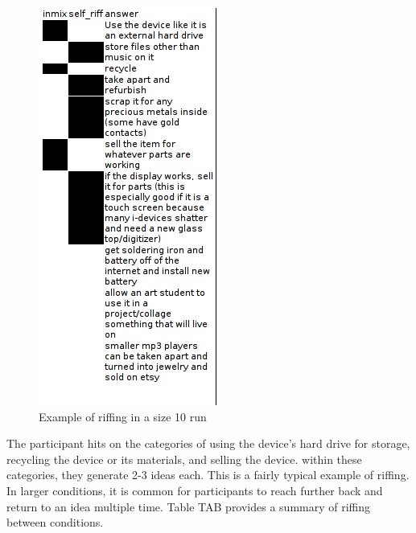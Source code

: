 \begin{figure}[h]
    \centering
    \includegraphics[width=0.5\columnwidth]{10_riff}
    \caption{Example of riffing in a size 10 run}
\end{figure}

The participant hits on the categories of using the device's hard drive for storage, recycling the device or its materials, and selling the device.  within these categories, they generate 2-3 ideas each. This is a fairly typical example of riffing. In larger conditions, it is common for participants to reach further back and return to an idea multiple time. Table TAB provides a summary of riffing between conditions.

